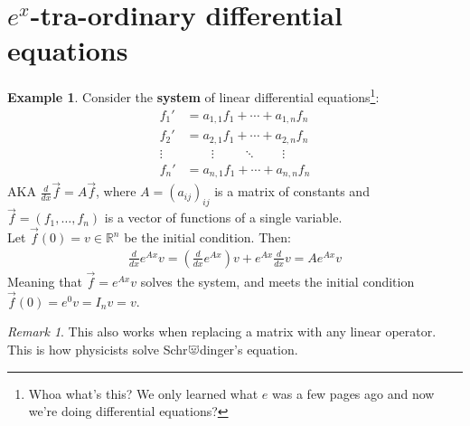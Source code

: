 \documentclass[12pt,a4paper]{amsart}
\theoremstyle{definition}
\newtheorem{Example}{Example}
\theoremstyle{remark}
\newtheorem*{Remark}	{Remark}
\def \R{\mathbb{R}}
\begin{document}
\section{$e^x$-tra-ordinary differential equations}
\begin{Example}
  Consider the {\bf system} of linear differential 
  equations\footnote{Whoa what's this? We only learned what $e$ 
  was a few pages ago and now we're doing differential equations?}:
  \begin{align*}
    f_1'&=a_{1,1}f_1+\cdots+a_{1,n}f_n\\
    f_2'&=a_{2,1}f_1+\cdots+a_{2,n}f_n\\
    \vdots&\qquad \vdots\qquad \ \ddots\qquad  \vdots\\
    f_n'&=a_{n,1}f_1+\cdots+a_{n,n}f_n
  \end{align*}
  AKA $\frac{d}{dx}\vec f = A \vec f$, 
  where ${A=(a_{ij})_{ij}}$ is a matrix of constants and 
  $\vec f = (f_1,\ldots,f_n)$ is a vector of functions of a 
  single variable. \\
  Let $\vec f(0)=v\in \R^n$ be the initial condition. Then:
  \begin{align*}
    \frac{d}{dx} e^{Ax}v=\left(\frac{d}{dx} e^{Ax}\right)v
    +e^{Ax}\frac{d}{dx}v = Ae^{Ax}v
  \end{align*}
  Meaning that $\vec f = e^{Ax}v$ solves the system, and meets the 
  initial condition $\vec f(0) = e^{0}v = I_nv=v$.
\end{Example}
\begin{Remark}
  This also works when replacing a matrix with any linear 
  operator. This is how physicists solve 
  Schr\includegraphics[width=10pt]{cat.png}dinger's equation.
\end{Remark}
\end{document}
